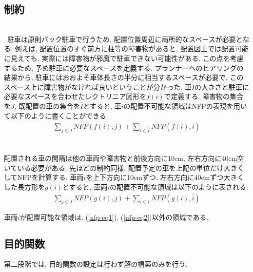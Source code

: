 \subsection{制約}
\\
\ 駐車は原則バック駐車で行うため, 配置位置周辺に局所的なスペースが必要となる. 
例えば, 配置位置のすぐ前方に柱等の障害物があると, 配置図上では配置可能に見えても, 実際には障害物が邪魔で駐車できない可能性がある.
この点を考慮するため, 予め駐車に必要なスペースを定義する.
プランナーへのヒアリングの結果から, 駐車にはおおよそ車体長さの半分に相当するスペースが必要で, このスペース上に障害物がなければ良いということが分かった. 
車$I$の大きさと駐車に必要なスペースを合わせたレクトリニア図形を$f(i)$で定義する. 
障害物の集合を$J$, 既配置の車の集合を$\overline{I}$とすると, 車$i$の配置不可能な領域はNFPの表現を用いて以下のように書くことができる.  
\begin{eqnarray}
    \label{nfp-eq1}
    \sum_{j \in J} NFP(f(i),j) + \sum_{\overline{i} \in \overline{I}} NFP(f(i),\overline{i})
\end{eqnarray}\\

\\
配置される車の間隔は他の車両や障害物と前後方向に10cm, 左右方向に40cm空いている必要がある. 
先ほどの制約同様, 配置予定の車を上記の単位だけ大きくしてNFPを計算する. 
車両$i$を上下方向に10cmずつ, 左右方向に40cmずつ大きくした長方形を$g(i)$とすると, 車両$i$の配置不可能な領域は以下のように表される. 
\begin{eqnarray}
    \label{nfp-eq2}
    \sum_{j \in J} NFP(g(i),j) + \sum_{\overline{i} \in \overline{I}} NFP(g(i),\overline{i})
\end{eqnarray}

車両$i$が配置可能な領域は, (\ref{nfp-eq1}), (\ref{nfp-eq2})以外の領域である. 

\subsection{目的関数}
第二段階では, 目的関数の設定は行わず解の構築のみを行う. 

